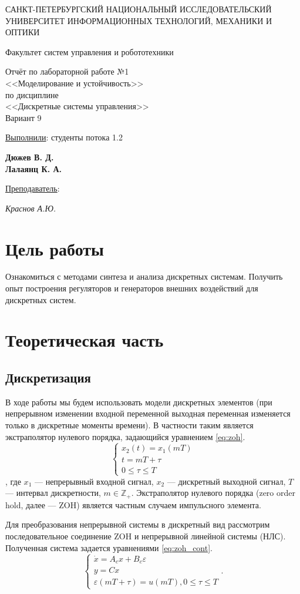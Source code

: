 \documentclass[a4paper, 14pt]{extarticle}
\theoremstyle{definition}
\theoremstyle{plain}
\theoremstyle{remark}
\newcommand*{\titlePage}{
	\thispagestyle{title}
	\begingroup
	\begin{center}
		\vspace*{3ex}
		{\small
			САНКТ-ПЕТЕРБУРГСКИЙ НАЦИОНАЛЬНЫЙ ИССЛЕДОВАТЕЛЬСКИЙ УНИВЕРСИТЕТ ИНФОРМАЦИОННЫХ ТЕХНОЛОГИЙ, МЕХАНИКИ И ОПТИКИ	
		}
		
		\vspace*{2ex}
		
		{\normalsize
			Факультет систем управления и робототехники
		}
		
		\vspace*{15ex}
		
		{
			Отчёт по лабораторной работе №1\\
			<<Моделирование и устойчивость>>\\
			по дисциплине\\
			<<Дискретные системы управления>>\\
				Вариант 9
			
		}
		
	\end{center}
	\vspace*{10ex}
	\begin{flushright}
		{\large 
			\underline{Выполнили}: студенты потока 1.2 \\
			\begin{flushright}
				\textbf{Дюжев В. Д.}\\
				\textbf{Лалаянц К. А.}\\
			\end{flushright}
		}
		\vspace*{5ex}
		{\large 
			\underline{Преподаватель}:\\ 
			\begin{flushright}
            \textit{Краснов А.Ю.}
			\end{flushright}
		}
	\end{flushright}	
	\newpage
	\setcounter{page}{1}
	\endgroup}
\begin{document}
\renewcommand{\contentsname}{\hfillОГЛАВЛЕНИЕ\hfill} 
\titlePage
\thispagestyle{plain}
\tableofcontents
\pagestyle{style}

\newpage
\setcounter{page}{1}

% 

\section{Цель работы}
Ознакомиться с методами синтеза и анализа дискретных системам. Получить опыт построения регуляторов и генераторов внешних воздействий для дискретных систем.

\section{Теоретическая часть}
\subsection{Дискретизация}
В ходе работы мы будем использовать модели дискретных элементов (при непрерывном изменении входной переменной выходная переменная изменяется только в
дискретные моменты времени). В частности таким является экстраполятор нулевого порядка, задающийся уравнением \ref{eq:zoh}.
\begin{equation}\label{eq:zoh}
	\begin{cases}
		x_2(t) = x_1(mT) \\
		t = mT + \tau \\ 0\le\tau\le T
	\end{cases}
\end{equation}
, где $x_1$ --- непрерывный входной сигнал, $x_2$ --- дискретный выходной сигнал, $T$ --- интервал дискретности, $m \in \mathbb{Z}_+$. Экстраполятор нулевого порядка (zero order hold, далее --- ZOH) является частным случаем импульсного элемента.

Для преобразования непрерывной системы в дискретный вид рассмотрим последовательное соединение ZOH и непрерывной линейной системы (НЛС). Полученная система задается уравнениями \ref{eq:zoh_cont}.
\begin{equation}\label{eq:zoh_cont}
	\begin{cases}
		\dot{x} = A_cx + B_c\varepsilon \\
		y = Cx \\
		\varepsilon(mT + \tau) = u(mT), 0\le\tau\le T
	\end{cases}.
\end{equation}
\end{document}
